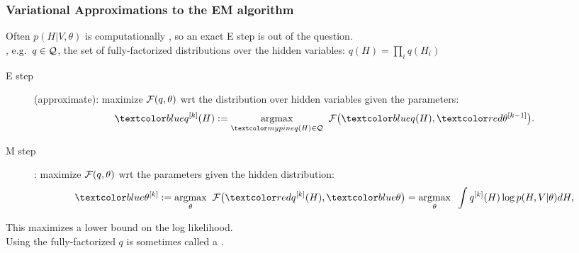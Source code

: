 \begin{frame}
\frametitle{Variational Approximations to the EM algorithm}

Often $p(H|V,\theta)$ is computationally , so an
exact E step is out of the question. \\[1ex]

, e.g.\ $q \in {\cal Q}$, the set of
fully-factorized distributions over the hidden variables: $q(H) =
\prod_i q(H_i)$   

\vspace{1ex}

\begin{description}
\item[E step] (approximate):
maximize ${\cal F}(q,\theta)$ wrt the distribution over hidden
variables given the parameters:
\begin{equation*}
\Blue{q^{[k]}(H)}:=\underset{\Green{q(H)\in {\cal Q}}}{\argmax}\;\;{\cal
F}\big(\Blue{q(H)},\Red{\theta^{[k-1]}}\big).
\end{equation*}
\item[M step]: maximize ${\cal F}(q,\theta)$ wrt the parameters given
the hidden distribution:
\begin{equation*}
\Blue{\theta^{[k]}}:=\underset{\theta}{\argmax}\;\;
{\cal F}\big(\Red{q^{[k]}(H)},\Blue{\theta}\big)=
\underset{\theta}{\argmax}\;\;\int q^{[k]}(H)\log p(H,V|\theta)dH,
\end{equation*}
\end{description}

This maximizes a lower bound on the log likelihood.\\[1ex]

Using the fully-factorized $q$ is sometimes called a . \\[1ex]

\end{frame}

